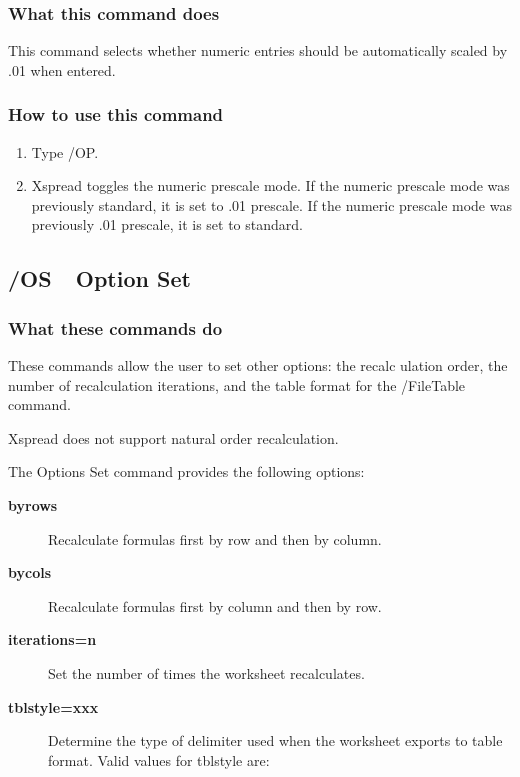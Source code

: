 \subsubsection*{What this command does}
This command selects whether numeric entries should be automatically 
scaled by .01 when entered.

\subsubsection*{How to use this command}
\begin{enumerate}
\item{Type /OP.}
\item{Xspread toggles the numeric prescale mode.  If the numeric
        prescale mode was previously standard, it is set to .01 prescale.
        If the numeric prescale mode was previously .01 prescale, it is
        set to standard.}
\end{enumerate}
        
\subsection*{/OS\ \      Option Set}

\subsubsection*{What these commands do}
These commands allow the user to set other options:  the  recalc
ulation order, the number of recalculation iterations, and the table 
format for the /FileTable command.

Xspread does not support natural order recalculation.

The Options Set command provides the following options:
\begin{description}
\item[{\bf byrows}]{Recalculate formulas first by row and then by column.}
\item[{\bf bycols  }]{Recalculate formulas first by column and then by row.}
\item[{\bf iterations=n}]{Set the number of times the worksheet recalculates.}
\item[{\bf tblstyle=xxx}]{Determine the type of delimiter used when the
        worksheet exports to table format.  Valid values for
        tblstyle are:
   }
\end{description}

